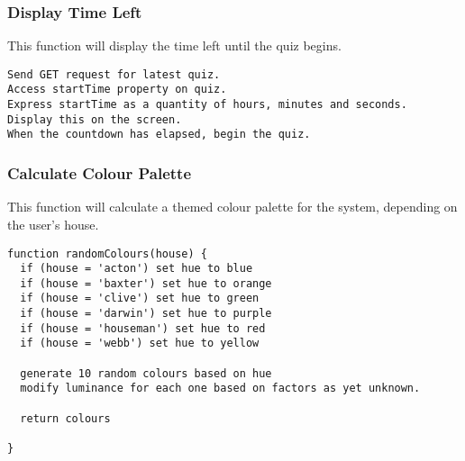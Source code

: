 \subsubsection{Display Time Left}
This function will display the time left until the quiz begins.
\begin{verbatim}
Send GET request for latest quiz.
Access startTime property on quiz.
Express startTime as a quantity of hours, minutes and seconds.
Display this on the screen.
When the countdown has elapsed, begin the quiz.
\end{verbatim}

\subsubsection{Calculate Colour Palette}
This function will calculate a themed colour palette for the system, depending on the user's house.
\begin{verbatim}
function randomColours(house) {
  if (house = 'acton') set hue to blue
  if (house = 'baxter') set hue to orange
  if (house = 'clive') set hue to green
  if (house = 'darwin') set hue to purple
  if (house = 'houseman') set hue to red
  if (house = 'webb') set hue to yellow
  
  generate 10 random colours based on hue
  modify luminance for each one based on factors as yet unknown.
  
  return colours
  
}
\end{verbatim}
